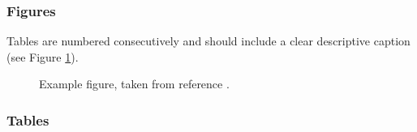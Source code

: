 \documentclass{ijuc}
\begin{document}
\subsubsection{Figures}

Tables are numbered consecutively and should include a clear
descriptive caption (see Figure \ref{fig-eg}).


\begin{figure}
\begin{center}
\end{center}
\caption{Example figure, taken from reference \cite{St1}.}
\label{fig-eg}
\end{figure}




\subsubsection{Tables}
\end{document}
